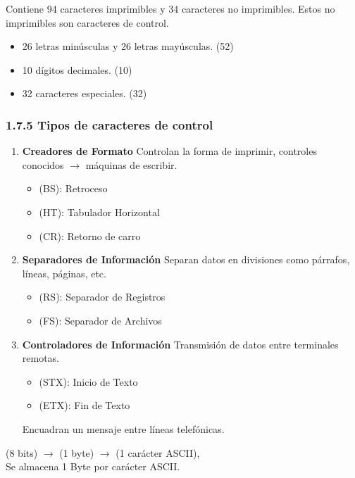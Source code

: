 Contiene 94 caracteres imprimibles y 34 caracteres no imprimibles. Estos no
imprimibles son caracteres de control.
\begin{itemize}
    \item 26 letras min\'{u}sculas y 26 letras may\'{u}sculas. (52)
    \item 10 d\'{i}gitos decimales. (10)
    \item 32 caracteres especiales. (32)
\end{itemize}
\medbreak

\subsubsection*{1.7.5 Tipos de caracteres de control}
\begin{enumerate}
    \item \textbf{Creadores de Formato} Controlan la forma de imprimir, controles conocidos
          $\rightarrow$ m\'{a}quinas  de escribir.
          \begin{itemize}
              \item (BS): Retroceso
              \item (HT): Tabulador Horizontal
              \item (CR): Retorno de carro
          \end{itemize}

    \item \textbf{Separadores de Informaci\'{o}n} Separan datos en divisiones como
          p\'{a}rrafos, l\'{i}neas, p\'{a}ginas, etc.
          \begin{itemize}
              \item (RS): Separador de Registros
              \item (FS): Separador de Archivos
          \end{itemize}

    \item \textbf{Controladores de Informaci\'{o}n} Transmisi\'{o}n de datos entre
          terminales remotas.
          \begin{itemize}
              \item (STX): Inicio de Texto
              \item (ETX): Fin de Texto
          \end{itemize}
          Encuadran un mensaje entre l\'{i}neas telef\'{o}nicas.
\end{enumerate}
(8 bits) $\rightarrow$ (1 byte) $\rightarrow$ (1 car\'{a}cter ASCII), \\
Se almacena 1 Byte por car\'{a}cter ASCII.

